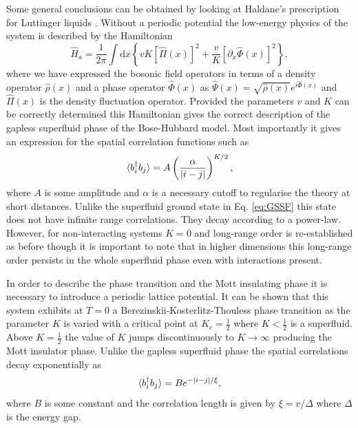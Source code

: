 Some general conclusions can be obtained by looking at Haldane's
prescription for Luttinger liquids \cite{haldane1981,
  giamarchi}. Without a periodic potential the low-energy physics of
the system is described by the Hamiltonian
\begin{equation}
  \hat{H}_a = \frac{1}{2 \pi} \int \mathrm{d} x \left\{ v K [ \hat{\Pi}(x)
    ]^2 + \frac{v} {K} [\partial_x \hat{\Phi}(x) ]^2 \right\},
\end{equation}
where we have expressed the bosonic field operators in terms of a
density operator $\hat{\rho}(x)$ and a phase operator $\hat{\Phi}(x)$
as $\hat{\Psi}(x) = \sqrt{\hat{\rho}(x)} e^{i \hat{\Phi}(x)}$
and $\hat{\Pi}(x)$ is the density fluctuation operator. Provided the
parameters $v$ and $K$ can be correctly determined this Hamiltonian
gives the correct description of the gapless superfluid phase of the
Bose-Hubbard model. Most importantly it gives an expression for the
spatial correlation functions such as
\begin{equation}
  \langle b^\dagger_i b_j \rangle = A \left( \frac{\alpha} {|i - j|} \right)^{K/2},
\end{equation}
where $A$ is some amplitude and $\alpha$ is a necessary cutoff to
regularise the theory at short distances. Unlike the superfluid ground
state in Eq. \eqref{eq:GSSF} this state does not have infinite range
correlations. They decay according to a power-law. However, for
non-interacting systems $K = 0$ and long-range order is re-established
as before though it is important to note that in higher dimensions
this long-range order persists in the whole superfluid phase even with
interactions present. 

In order to describe the phase transition and the Mott insulating
phase it is necessary to introduce a periodic lattice potential. It
can be shown that this system exhibits at $T = 0$ a
Berezinskii-Kosterlitz-Thouless phase transition as the parameter $K$
is varied with a critical point at $K_c = \frac{1}{2}$ where
$K < \frac{1}{2}$ is a superfluid. Above $K = \frac{1}{2}$ the value
of $K$ jumps discontinuously to $K \rightarrow \infty$ producing the
Mott insulator phase. Unlike the gapless superfluid phase the spatial
correlations decay exponentially as
\begin{equation}
  \langle b^\dagger_i b_j \rangle = B e^{ - |i - j|/\xi},
\end{equation}
where $B$ is some constant  and the correlation length is given by
$\xi = v / \Delta$ where $\Delta$ is the energy gap.

